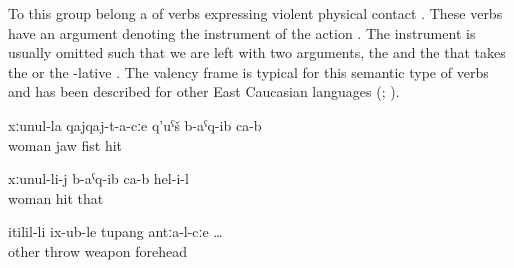 To this group belong a  of verbs expressing violent physical contact . These verbs have an  argument denoting the instrument of the action . The instrument is usually omitted such that we are left with two arguments, the   and the  that takes the  or the -lative . The valency frame is typical for this semantic type of verbs and has been described for other East Caucasian languages (\citealp[332]{Khalilova2009}; \citealp[476]{Forker2013a}). 
%
\begin{exe}
	\ex	\label{ex:transitive contact verbs}
	\begin{xlist}
		\ex	{} 
		\ex	{} 
		\ex	{} 
	\end{xlist}

	\ex	\label{ex:He hit with the fist on the jaw of his wife}
	\gll	xːunul-la	qajqaj-t-a-cːe	q'uˁš	b-aˁq-ib	ca-b\\
		woman	jaw	fist	hit	\\
	\glt	{}

	\ex	\label{ex:He hit his wife}
	\gll	xːunul-li-j	b-aˁq-ib	ca-b	hel-i-l\\
		woman	hit		that\\
	\glt	{}

	\ex	\label{ex:when the other shot into the forehead}
	\gll	itilil-li	ix-ub-le	tupang	antːa-l-cːe	\ldots\\
		other	throw	weapon	forehead\\
	\glt	{}
\end{exe}

